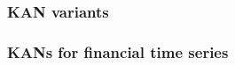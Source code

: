 \documentclass[12pt,a4paper,oneside]{article}
\begin{document}
\subsubsection{KAN variants}\label{subsubsec:kan_variants}

%


\subsubsection{KANs for financial time series}\label{subsubsec:kan_finance}
\end{document}
